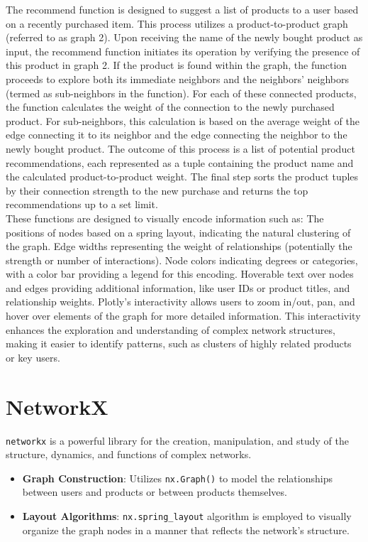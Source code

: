 \documentclass[fontsize=11pt]{article}
\begin{document}
The recommend function is designed to suggest a list of products to a user based on a recently purchased item. This process utilizes a product-to-product graph (referred to as graph 2). Upon receiving the name of the newly bought product as input, the recommend function initiates its operation by verifying the presence of this product in graph 2. If the product is found within the graph, the function proceeds to explore both its immediate neighbors and the neighbors' neighbors (termed as sub-neighbors in the function). For each of these connected products, the function calculates the weight of the connection to the newly purchased product. For sub-neighbors, this calculation is based on the average weight of the edge connecting it to its neighbor and the edge connecting the neighbor to the newly bought product. The outcome of this process is a list of potential product recommendations, each represented as a tuple containing the product name and the calculated product-to-product weight. The final step sorts the product tuples by their connection strength to the new purchase and returns the top recommendations up to a set limit.\\


These functions are designed to visually encode information such as:
The positions of nodes based on a spring layout, indicating the natural clustering of the graph.
Edge widths representing the weight of relationships (potentially the strength or number of interactions).
Node colors indicating degrees or categories, with a color bar providing a legend for this encoding.
Hoverable text over nodes and edges providing additional information, like user IDs or product titles, and relationship weights. Plotly's interactivity allows users to zoom in/out, pan, and hover over elements of the graph for more detailed information. This interactivity enhances the exploration and understanding of complex network structures, making it easier to identify patterns, such as clusters of highly related products or key users.

\section*{NetworkX}

\texttt{networkx} is a powerful library for the creation, manipulation, and study of the structure, dynamics, and functions of complex networks.

\begin{itemize}
    \item \textbf{Graph Construction}: Utilizes \texttt{nx.Graph()} to model the relationships between users and products or between products themselves.
    \item \textbf{Layout Algorithms}: \texttt{nx.spring\_layout} algorithm is employed to visually organize the graph nodes in a manner that reflects the network's structure.
\end{itemize}
\end{document}
